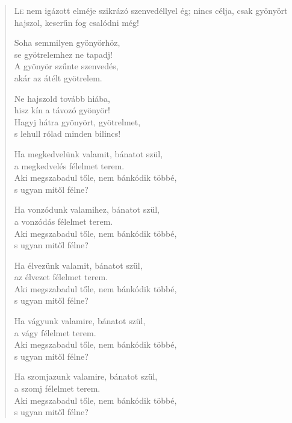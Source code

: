 
\begin{verse}

{\par%
\lettrine{L}{e} {\LettrineTextFont nem igázott elméje}\newline
szikrázó szenvedéllyel ég;\newline
nincs célja, csak gyönyört hajszol,\verselinebreak
keserűn fog csalódni még!
\par}

 Soha semmilyen gyönyörhöz,\\
se gyötrelemhez ne tapadj!\\
A gyönyör szűnte szenvedés,\\
akár az átélt gyötrelem.

 Ne hajszold tovább hiába,\\
hisz kín a távozó gyönyör!\\
Hagyj hátra gyönyört, gyötrelmet,\\
s lehull rólad minden bilincs!

 Ha megkedvelünk valamit, bánatot szül,\\
a megkedvelés félelmet terem.\\
Aki megszabadul tőle, nem bánkódik többé,\\
s ugyan mitől félne?

 Ha vonzódunk valamihez, bánatot szül,\\
a vonzódás félelmet terem.\\
Aki megszabadul tőle, nem bánkódik többé,\\
s ugyan mitől félne?

 Ha élvezünk valamit, bánatot szül,\\
az élvezet félelmet terem.\\
Aki megszabadul tőle, nem bánkódik többé,\\
s ugyan mitől félne?

 Ha vágyunk valamire, bánatot szül,\\
a vágy félelmet terem.\\
Aki megszabadul tőle, nem bánkódik többé,\\
s ugyan mitől félne?

 Ha szomjazunk valamire, bánatot szül,\\
a szomj félelmet terem.\\
Aki megszabadul tőle, nem bánkódik többé,\\
s ugyan mitől félne?


\end{verse}
